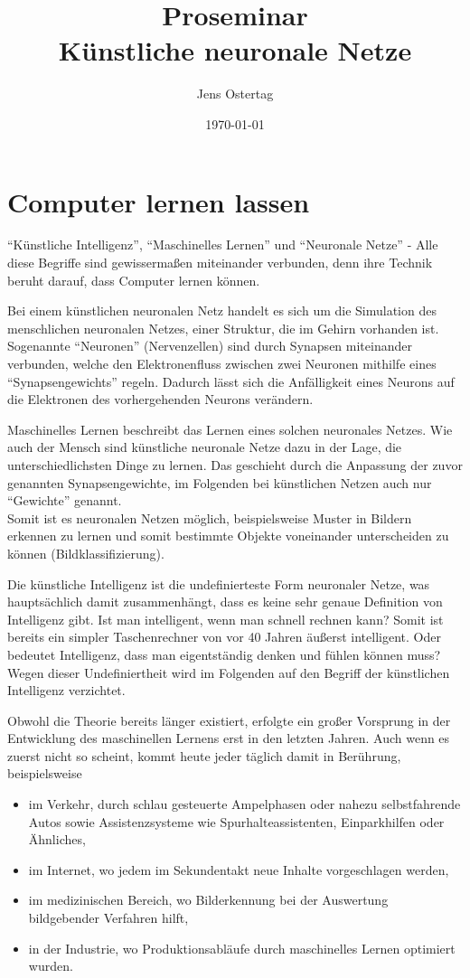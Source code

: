 \documentclass[12pt,a4]{article}
\title{\textbf{Proseminar\\Künstliche neuronale Netze}}
\author{Jens Ostertag}
\date{\today}
\begin{document}
\maketitle
\tableofcontents
\clearpage
\section{Computer lernen lassen}
\enquote{Künstliche Intelligenz}, \enquote{Maschinelles Lernen} und \enquote{Neuronale Netze} - Alle diese Begriffe sind gewissermaßen miteinander verbunden, denn ihre Technik beruht darauf, dass Computer lernen können.

Bei einem künstlichen neuronalen Netz handelt es sich um die Simulation des menschlichen neuronalen Netzes, einer Struktur, die im Gehirn vorhanden ist. Sogenannte \enquote{Neuronen} (Nervenzellen) sind durch Synapsen miteinander verbunden, welche den Elektronenfluss zwischen zwei Neuronen mithilfe eines \enquote{Synapsengewichts} regeln. Dadurch lässt sich die Anfälligkeit eines Neurons auf die Elektronen des vorhergehenden Neurons verändern. \cite{Synapsengewicht}

Maschinelles Lernen beschreibt das Lernen eines solchen neuronales Netzes. Wie auch der Mensch sind künstliche neuronale Netze dazu in der Lage, die unterschiedlichsten Dinge zu lernen. Das geschieht durch die Anpassung der zuvor genannten Synapsengewichte, im Folgenden bei künstlichen Netzen auch nur \enquote{Gewichte} genannt.\\
Somit ist es neuronalen Netzen möglich, beispielsweise Muster in Bildern erkennen zu lernen und somit bestimmte Objekte voneinander unterscheiden zu können (Bildklassifizierung).

Die künstliche Intelligenz ist die undefinierteste Form neuronaler Netze, was hauptsächlich damit zusammenhängt, dass es keine sehr genaue Definition von Intelligenz gibt. Ist man intelligent, wenn man schnell rechnen kann? Somit ist bereits ein simpler Taschenrechner von vor 40 Jahren äußerst intelligent. Oder bedeutet Intelligenz, dass man eigentständig denken und fühlen können muss? Wegen dieser Undefiniertheit wird im Folgenden auf den Begriff der künstlichen Intelligenz verzichtet.

Obwohl die Theorie bereits länger existiert, erfolgte ein großer Vorsprung in der Entwicklung des maschinellen Lernens erst in den letzten Jahren. Auch wenn es zuerst nicht so scheint, kommt heute jeder täglich damit in Berührung, beispielsweise
\begin{itemize}
\item im Verkehr, durch schlau gesteuerte Ampelphasen oder nahezu selbstfahrende Autos sowie Assistenzsysteme wie Spurhalteassistenten, Einparkhilfen oder Ähnliches,
\item im Internet, wo jedem im Sekundentakt neue Inhalte vorgeschlagen werden,
\item im medizinischen Bereich, wo Bilderkennung bei der Auswertung bildgebender Verfahren hilft,
\item in der Industrie, wo Produktionsabläufe durch maschinelles Lernen optimiert wurden.
\end{itemize}
\end{document}
